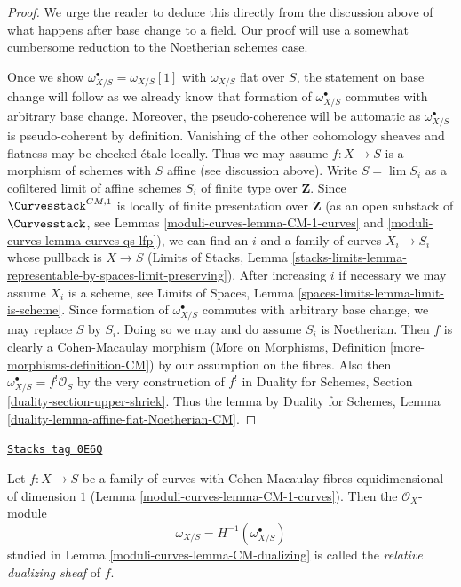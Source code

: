 \begin{proof}
We urge the reader to deduce this directly from the discussion above
of what happens after base change to a field. Our proof will
use a somewhat cumbersome reduction to the Noetherian schemes case.

\medskip\noindent
Once we show $\omega_{X/S}^\bullet = \omega_{X/S}[1]$ with
$\omega_{X/S}$ flat over $S$, the statement on base change
will follow as we already know that formation of $\omega_{X/S}^\bullet$
commutes with arbitrary base change. Moreover, the pseudo-coherence
will be automatic as $\omega_{X/S}^\bullet$ is pseudo-coherent
by definition. Vanishing of the other cohomology sheaves and flatness
may be checked \'etale locally. Thus we may assume $f : X \to S$
is a morphism of schemes with $S$ affine (see discussion above).
Write $S = \lim S_i$ as a cofiltered limit of affine schemes $S_i$
of finite type over $\mathbf{Z}$.
Since $\Curvesstack^{CM, 1}$ is locally of finite presentation over
$\mathbf{Z}$ (as an open substack of $\Curvesstack$, see
Lemmas \ref{moduli-curves-lemma-CM-1-curves} and \ref{moduli-curves-lemma-curves-qs-lfp}),
we can find an $i$ and a family
of curves $X_i \to S_i$ whose pullback is $X \to S$
(Limits of Stacks, Lemma
\ref{stacks-limits-lemma-representable-by-spaces-limit-preserving}).
After increasing $i$ if necessary we may assume $X_i$ is a scheme,
see Limits of Spaces, Lemma \ref{spaces-limits-lemma-limit-is-scheme}.
Since formation of $\omega_{X/S}^\bullet$ commutes with
arbitrary base change, we may replace $S$ by $S_i$.
Doing so we may and do assume $S_i$ is Noetherian.
Then $f$ is clearly a Cohen-Macaulay morphism
(More on Morphisms, Definition \ref{more-morphisms-definition-CM})
by our assumption on the fibres.
Also then $\omega_{X/S}^\bullet = f^!\mathcal{O}_S$
by the very construction of $f^!$ in
Duality for Schemes, Section \ref{duality-section-upper-shriek}.
Thus the lemma by Duality for Schemes, Lemma
\ref{duality-lemma-affine-flat-Noetherian-CM}.
\end{proof}

\begin{definition}
\label{moduli-curves-definition-relative-dualizing-sheaf}
\href{https://stacks.math.columbia.edu/tag/0E6Q}{\texttt{Stacks tag 0E6Q}}

Let $f : X \to S$ be a family of curves with Cohen-Macaulay fibres
equidimensional of dimension $1$ (Lemma \ref{moduli-curves-lemma-CM-1-curves}).
Then the $\mathcal{O}_X$-module
$$
\omega_{X/S} = H^{-1}(\omega_{X/S}^\bullet)
$$
studied in Lemma \ref{moduli-curves-lemma-CM-dualizing}
is called the {\it relative dualizing sheaf} of $f$.
\end{definition}

